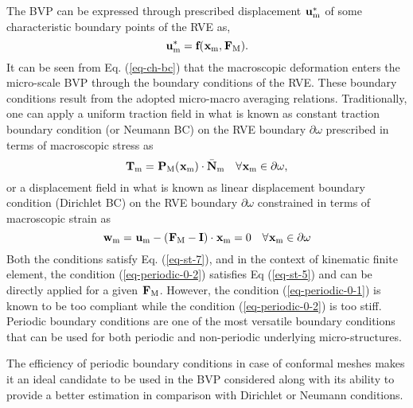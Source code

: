 The BVP can be expressed through prescribed displacement $\tgmm{u}^*$ of some characteristic boundary points of the RVE as,
\begin{equation}
\tgmm{u}^*=\textbf{f}(\tgmm[]{x},\tgm{F}).\label{eq-ch-bc}
\end{equation}
It can be seen from Eq. (\ref{eq-ch-bc}) that the macroscopic deformation enters the micro-scale BVP through the boundary conditions of the RVE. These boundary conditions result from the adopted micro-macro averaging relations. Traditionally, one can apply a uniform traction field in what is known as constant traction boundary condition (or Neumann BC) on the RVE boundary $ \partial\omega $ prescribed in terms of macroscopic stress as
\begin{equation}\label{eq-periodic-0-1}
\tgmm{T}=\tgm{P}(\tgmm{x})\cdot\bar{\textbf{N}}_\text{m}\quad\forall\tgmm{x}\in\partial\omega,
\end{equation}
or a displacement field in what is known as linear displacement boundary condition (Dirichlet BC) on the RVE boundary $ \partial\omega $ constrained in terms of macroscopic strain as
\begin{equation}\label{eq-periodic-0-2}
\tgmm{w}=\tgmm{u}-(\tgm{F}-\textbf{I})\cdot\tgmm{x}=0\quad\forall\tgmm{x}\in\partial\omega
\end{equation}
Both the conditions satisfy Eq. (\ref{eq-st-7}), and in the context of kinematic finite element, the condition (\ref{eq-periodic-0-2}) satisfies Eq (\ref{eq-st-5}) and can be directly applied for a given $ \tgm{F} $. However, the condition (\ref{eq-periodic-0-1}) is known to be too compliant while the condition (\ref{eq-periodic-0-2}) is too stiff. Periodic boundary conditions are one of the most versatile boundary conditions that can be used for both periodic and non-periodic underlying micro-structures\cite{kouznetsovaApproachMicromacroModeling2001,mieheStraindrivenHomogenizationInelastic2002}. 

The efficiency of periodic boundary conditions in case of conformal meshes makes it an ideal candidate to be used in the BVP considered along with its ability to provide a better estimation in comparison with Dirichlet or Neumann conditions\cite{nguyenImposingPeriodicBoundary2012}. 


